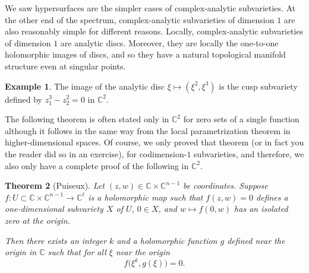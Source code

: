 \documentclass[12pt,openany]{book}
\newcommand{\C}{{\mathbb{C}}}
\newcommand{\myindex}[1]{#1\index{#1}}
\theoremstyle{plain}
\newtheorem{thm}{Theorem}[section]
\theoremstyle{remark}
\theoremstyle{definition}
\theoremstyle{exercise}
\theoremstyle{example}
\newtheorem{example}[thm]{Example}
\begin{document}
\medskip

We saw hypersurfaces are the simpler cases of complex-analytic
subvarieties.  At the other end of the spectrum, complex-analytic
subvarieties of dimension $1$ are also reasonably simple for different reasons.
Locally, complex-analytic subvarieties of dimension $1$ are analytic discs.
Moreover, they are locally the one-to-one holomorphic images of discs,
and so they have a natural topological manifold structure even at singular
points.

\begin{example}
The image of the analytic disc
$\xi \mapsto (\xi^2,\xi^3)$ is the cusp subvariety
defined by $z_1^3-z_2^2 = 0$ in $\C^2$.
\end{example}


The following theorem is often stated only in $\C^2$ for zero sets of
a single function although it follows in
the same way from the local parametrization theorem in higher-dimensional
spaces.  Of course, we only
proved that theorem (or in fact you the reader did so in an exercise), for
codimension-$1$ subvarieties, and therefore, we also only have a complete
proof of the following in $\C^2$.

\begin{thm}[\myindex{Puiseux}]
Let $(z,w) \in \C \times \C^{n-1}$ be coordinates.
Suppose $f \colon U \subset \C \times \C^{n-1} \to \C^\ell$
is a holomorphic map such that
$f(z,w) = 0$ defines a one-dimensional subvariety $X$ of $U$,
$0 \in X$,
and $w \mapsto f(0,w)$ has an isolated zero at the origin.

Then there exists an integer $k$ and a holomorphic function $g$ defined near
the origin in $\C$ such that
for all $\xi$ near the origin
\begin{equation*}
f\bigl(\xi^k,g(\xi)\bigr) = 0 .
\end{equation*}
\end{thm}
\end{document}

